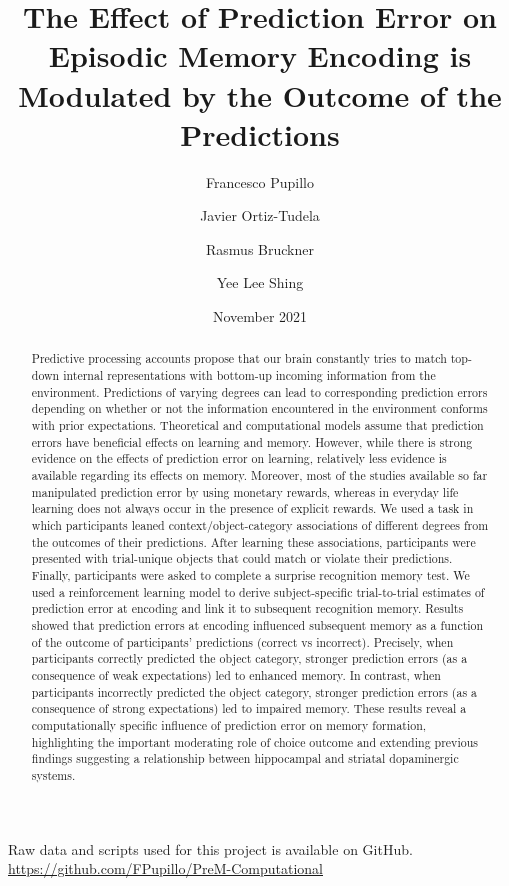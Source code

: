 \documentclass[a4paper,12pt]{article}
\title{The Effect of Prediction Error on Episodic Memory Encoding is Modulated by the Outcome of the Predictions}
\author[1]{Francesco Pupillo}
\author[1]{Javier Ortiz-Tudela}
\author[2]{Rasmus Bruckner}
\author[1]{Yee Lee Shing}
\affil[1]{Goethe-Universität Frankfurt}
\affil[2]{Freie Universität Berlin}
\date{November 2021}
\begin{document}
{
\hypersetup{linkcolor=black}
\tableofcontents
}
\setlength{\parindent}{10ex}

\maketitle

\noindent
Raw data and scripts used for this project is available on GitHub. \url{https://github.com/FPupillo/PreM-Computational} 

\doublespacing

\begin{abstract}
\noindent
Predictive processing accounts propose that our brain constantly tries to match top-down internal representations with bottom-up incoming information from the environment. Predictions of varying degrees can lead to corresponding prediction errors depending on whether or not the information encountered in the environment conforms with prior expectations. Theoretical and computational models assume that prediction errors have beneficial effects on learning and memory. However, while there is strong evidence on the effects of prediction error on learning, relatively less evidence is available regarding its effects on memory. Moreover, most of the studies available so far manipulated prediction error by using monetary rewards, whereas in everyday life learning does not always occur in the presence of explicit rewards. We used a task in which participants leaned context/object-category associations of different degrees from the outcomes of their predictions. After learning these associations, participants were presented with trial-unique objects that could match or violate their predictions.
Finally, participants were asked to complete a surprise recognition memory test. We used a reinforcement learning model to derive subject-specific trial-to-trial estimates of prediction error at encoding and link it to subsequent recognition memory. Results showed that prediction errors at encoding influenced subsequent memory as a function of the outcome of participants’ predictions (correct vs incorrect). Precisely, when participants correctly predicted the object category, stronger prediction errors (as a consequence of weak expectations) led to enhanced memory. In contrast, when participants incorrectly predicted the object category, stronger prediction errors (as a consequence of strong  expectations) led to impaired memory. These results reveal a computationally specific influence of prediction error on memory formation, highlighting the important moderating role of choice outcome and extending previous findings suggesting a relationship between hippocampal and striatal dopaminergic systems.     
\end{abstract}
\end{document}
